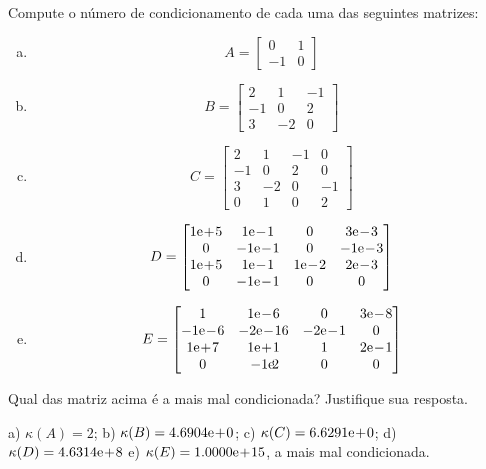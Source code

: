 \begin{exer}
  Compute o número de condicionamento de cada uma das seguintes matrizes:
  \begin{enumerate}[a)]
  \item
    \begin{equation}
      A =
      \begin{bmatrix}
        0 & 1\\
        -1 & 0
      \end{bmatrix}
    \end{equation}
  \item 
    \begin{equation}
      B =
      \begin{bmatrix}
        2 & 1 & -1\\
        -1 & 0 & 2\\
        3 & -2 & 0
      \end{bmatrix}
    \end{equation}
  \item 
    \begin{equation}
      C =
      \begin{bmatrix}
        2 & 1 & -1 & 0\\
        -1 & 0 & 2 & 0\\
        3 & -2 & 0 & -1\\
        0 & 1 & 0 & 2
      \end{bmatrix}
    \end{equation}
  \item
    \begin{equation}
      D =
      \begin{bmatrix}
        1\E+5 & 1\E-1 & 0 & 3\E-3\\
        0 & -1\E-1 & 0 & -1\E-3\\
        1\E+5 & 1\E-1 & 1\E-2 & 2\E-3\\
        0 & -1\E-1 & 0 & 0
      \end{bmatrix}
    \end{equation}
    \item
      \begin{equation}
        E =
        \begin{bmatrix}
          1 & 1\E-6 & 0 & 3\E-8 \\
          -1\E-6 & -2\E-16 & -2\E-1 & 0\\
          1\E+7 & 1\E+1 & 1 & 2\E-1 \\
          0 & -1\E2 & 0 & 0
      \end{bmatrix}
    \end{equation}
  \end{enumerate}
  Qual das matriz acima é a mais mal condicionada? Justifique sua resposta.
\end{exer}
\begin{resp}
  a) $\kappa(A) = 2$; b) $\kappa(B) = 4.6904\mathrm{e}\!+\!0$; c) $\kappa(C) = 6.6291\mathrm{e}\!+\!0$; d) $\kappa(D) = 4.6314\mathrm{e}\!+\!8$ e) $\kappa(E) = 1.0000\mathrm{e}\!+\!15$, a mais mal condicionada.
\end{resp}

